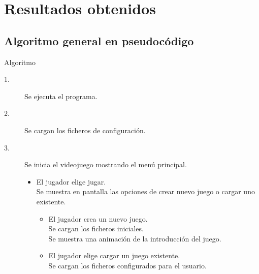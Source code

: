 \documentclass[9pt,xcolor=svgnames]{beamer}
\begin{document}
  
  
 \section{Resultados obtenidos}
 
  \subsection{Algoritmo general en pseudocódigo}

  \begin{frame}{Algoritmo}
   
   \begin{description}
    \item[1.] Se ejecuta el programa.
    \item[2.] Se cargan los ficheros de configuración.
    \item[3.] Se inicia el videojuego mostrando el menú principal.
	  
	       \begin{itemize}
		\item El jugador elige jugar.\\
		      Se muestra en pantalla las opciones de crear nuevo
		      juego o cargar uno existente.
		      
		      \begin{itemize}
		       \item El jugador crea un nuevo juego. \\
			     Se cargan los ficheros iniciales. \\
			     Se muestra una animación de la introducción
			     del juego.			     
		       \item El jugador elige  cargar un juego existente. \\
			     Se cargan los ficheros configurados
			     para el usuario.
		      \end{itemize}
	       \end{itemize}
   \end{description}
   
  \end{frame}
\end{document}
